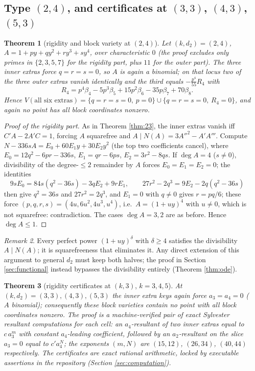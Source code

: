 \documentclass[11pt]{article}
\newtheorem{theorem}{Theorem}[section]
\theoremstyle{definition}
\theoremstyle{remark}
\newtheorem{remark}[theorem]{Remark}
\begin{document}
\subsection{Type $(2,4)$, and certificates at $(3,3)$, $(4,3)$, $(5,3)$}

\begin{theorem}[rigidity and block variety at $(2,4)$]\label{thm:24}
Let $(k,d_2)=(2,4)$, $A=1+py+qy^2+ry^3+sy^4$, over characteristic $0$ (the proof excludes only primes in $\{2,3,5,7\}$ for the rigidity part, plus $11$ for the outer part). The three inner extras force $q=r=s=0$, so $A$ is again a binomial; on that locus two of the three outer extras vanish identically and the third equals $-\frac{p^4}{55}R_4$ with
\[
R_4=p^4\beta_4-5p^3\beta_5+15p^2\beta_6-35p\beta_7+70\beta_8 .
\]
Hence $V(\text{all six extras})=\{q=r=s=0,\ p=0\}\cup\{q=r=s=0,\ R_4=0\}$, and again no point has all block coordinates nonzero.
\end{theorem}

\begin{proof}[Proof of the rigidity part]
As in Theorem \ref{thm:23}, the inner extras vanish iff $C'A-2A'C=1$, forcing $A$ squarefree and $A\mid N(A)=3A''^2-A'A'''$. Compute $N-336sA=E_0+60E_1y+30E_2y^2$ (the top two coefficients cancel), where $E_0=12q^2-6pr-336s$, $E_1=qr-6ps$, $E_2=3r^2-8qs$. If $\deg A=4$ ($s\neq0$), divisibility of the degree-$\leq2$ remainder by $A$ forces $E_0=E_1=E_2=0$; the identities
\[
9sE_0=84s(q^2-36s)-3qE_2+9rE_1,\qquad 27r^2-2q^3=9E_2-2q(q^2-36s)
\]
then give $q^2=36s$ and $27r^2=2q^3$, and $E_1=0$ with $q\neq0$ gives $r=pq/6$; these force $(p,q,r,s)=(4u,6u^2,4u^3,u^4)$, i.e.\ $A=(1+uy)^4$ with $u\neq0$, which is not squarefree: contradiction. The cases $\deg A=3,2$ are as before. Hence $\deg A\leq1$.
\end{proof}

\begin{remark}
Every perfect power $(1+uy)^\delta$ with $\delta\geq4$ satisfies the divisibility $A\mid N(A)$; it is squarefreeness that eliminates it. Any direct extension of this argument to general $d_2$ must keep both halves; the proof in Section \ref{sec:functional} instead bypasses the divisibility entirely (Theorem \ref{thm:ode}).
\end{remark}

\begin{theorem}[rigidity certificates at $(k,3)$, $k=3,4,5$]\label{thm:k3}
At $(k,d_2)=(3,3),(4,3),(5,3)$ the inner extra keys again force $a_3=a_4=0$ ($A$ binomial); consequently these block varieties contain no point with all block coordinates nonzero. The proof is a machine-verified pair of exact Sylvester resultant computations for each cell: an $a_4$-resultant of two inner extras equal to $c\,a_3^m$ with constant $a_4$-leading coefficient, followed by an $a_2$-resultant on the slice $a_3=0$ equal to $c'a_4^N$; the exponents $(m,N)$ are $(15,12)$, $(26,34)$, $(40,44)$ respectively. The certificates are exact rational arithmetic, locked by executable assertions in the repository (Section \ref{sec:computation}).
\end{theorem}
\end{document}
